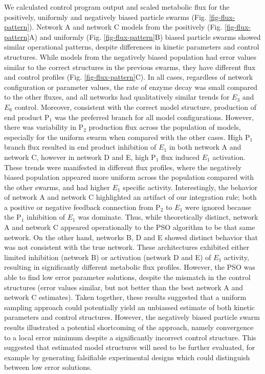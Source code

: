 \documentclass[12pt]{article}
\begin{document}
We calculated control program output and scaled metabolic flux for the positively, uniformly and negatively biased particle swarms (Fig. \ref{fig-flux-pattern}). 
Network A and network C models from the positively (Fig. \ref{fig-flux-pattern}A) and uniformly (Fig. \ref{fig-flux-pattern}B) biased particle swarms showed similar operational patterns, despite differences in kinetic parameters and control structures.
While models from the negatively biased population had error values similar to the correct structures in the previous swarms, they have different flux and control profiles (Fig. \ref{fig-flux-pattern}C). 
In all cases, regardless of network configuration or parameter values, the rate of enzyme decay was small compared to the other fluxes, and all networks had qualitatively similar trends for $E_{3}$ and $E_{6}$ control. 
Moreover, consistent with the correct model structure, production of end product P$_1$ was the preferred branch for all model configurations. 
However, there was variability in P$_{2}$ production flux across the population of models, especially for the uniform swarm when compared with the other cases. 
High P$_{1}$ branch flux resulted in end product inhibition of $E_{1}$ in both network A and network C, however in network D and E, high P$_1$ flux induced $E_1$ activation. 
These trends were manifested in different flux profiles, where the negatively biased population appeared more uniform across the population compared with the other swarms, and had higher $E_{1}$ specific activity. 
Interestingly, the behavior of network A and network C highlighted an artifact of our integration rule; both a positive or negative feedback connection from P$_2$ to $E_{1}$ were ignored because the P$_{1}$ inhibition of $E_{1}$ was dominate. Thus, while theoretically distinct, network A and network C appeared operationally to the PSO algorithm to be that same network. 
On the other hand, networks B, D and E showed distinct behavior that was not consistent with the true network. 
These architectures exhibited either limited inhibition (network B) or activation (network D and E) of $E_{1}$ activity, resulting in significantly different metabolic flux profiles. 
However, the PSO was able to find low error parameter solutions, despite the mismatch in the control structures (error values similar, but not better than the best network A and network C estimates). 
Taken together, these results suggested that a uniform sampling approach could potentially yield an unbiassed estimate of both kinetic parameters and control structures. 
However, the negatively biased particle swarm results illustrated a potential shortcoming of the approach, namely convergence to a local error minimum despite a significantly incorrect control structure. 
This suggested that estimated model structures will need to be further evaluated, for example by generating falsifiable experimental designs which could distinguish between low error solutions.
\end{document}

